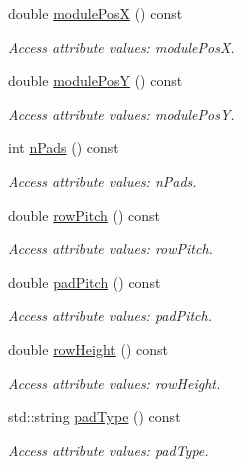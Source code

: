\begin{DoxyCompactItemize}
double \hyperlink{struct_d_d4hep_1_1_x_m_l_1_1_dimension_abb2fc4d39393a2376fa3a4a7af27ed6c}{module\+PosX} () const
\begin{DoxyCompactList}\small\item\em Access attribute values\+: module\+PosX. \end{DoxyCompactList}\item 
double \hyperlink{struct_d_d4hep_1_1_x_m_l_1_1_dimension_afacf7a51cee20fe109a53eda5c8a0ead}{module\+PosY} () const
\begin{DoxyCompactList}\small\item\em Access attribute values\+: module\+PosY. \end{DoxyCompactList}\item 
int \hyperlink{struct_d_d4hep_1_1_x_m_l_1_1_dimension_a2413f00a297f8d58f6c97d314bc57714}{n\+Pads} () const
\begin{DoxyCompactList}\small\item\em Access attribute values\+: n\+Pads. \end{DoxyCompactList}\item 
double \hyperlink{struct_d_d4hep_1_1_x_m_l_1_1_dimension_a53810c784b62629f82e162238dc72ddd}{row\+Pitch} () const
\begin{DoxyCompactList}\small\item\em Access attribute values\+: row\+Pitch. \end{DoxyCompactList}\item 
double \hyperlink{struct_d_d4hep_1_1_x_m_l_1_1_dimension_aa235941c309f7e4256de9278ed8e4310}{pad\+Pitch} () const
\begin{DoxyCompactList}\small\item\em Access attribute values\+: pad\+Pitch. \end{DoxyCompactList}\item 
double \hyperlink{struct_d_d4hep_1_1_x_m_l_1_1_dimension_a58a91182ffd8afcd25ddf043d81ece32}{row\+Height} () const
\begin{DoxyCompactList}\small\item\em Access attribute values\+: row\+Height. \end{DoxyCompactList}\item 
std\+::string \hyperlink{struct_d_d4hep_1_1_x_m_l_1_1_dimension_a2fe45821279a8240b345cc27033dc920}{pad\+Type} () const
\begin{DoxyCompactList}\small\item\em Access attribute values\+: pad\+Type. \end{DoxyCompactList}\item 

\end{DoxyCompactItemize}
